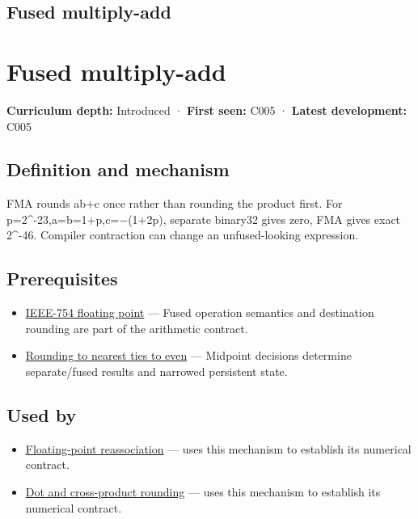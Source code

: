 \hypertarget{appendix-41e8ef22a21e}{}
\section*{Fused multiply-add}
\chapter{Fused multiply-add}\label{appendix-41e8ef22a21e-fused-multiply-add}

\textbf{Curriculum depth:} Introduced · \textbf{First seen:} C005 · \textbf{Latest development:} C005

\section{Definition and mechanism}\label{appendix-41e8ef22a21e-definition-and-mechanism}

FMA rounds ab+c once rather than rounding the product first. For p=2\^{}-23,a=b=1+p,c=−(1+2p), separate binary32 gives zero, FMA gives exact 2\^{}-46. Compiler contraction can change an unfused-looking expression.

\section{Prerequisites}\label{appendix-41e8ef22a21e-prerequisites}

\begin{itemize}
\tightlist
\item
  \hyperref[appendix-343615f49ddf]{IEEE-754 floating point} --- Fused operation semantics and destination rounding are part of the arithmetic contract.
\item
  \hyperref[appendix-614afe1de592]{Rounding to nearest ties to even} --- Midpoint decisions determine separate/fused results and narrowed persistent state.
\end{itemize}

\section{Used by}\label{appendix-41e8ef22a21e-used-by}

\begin{itemize}
\tightlist
\item
  \hyperref[appendix-c2ac4a84c283]{Floating-point reassociation} --- uses this mechanism to establish its numerical contract.
\item
  \hyperref[appendix-5aef4f13483a]{Dot and cross-product rounding} --- uses this mechanism to establish its numerical contract.
\end{itemize}

